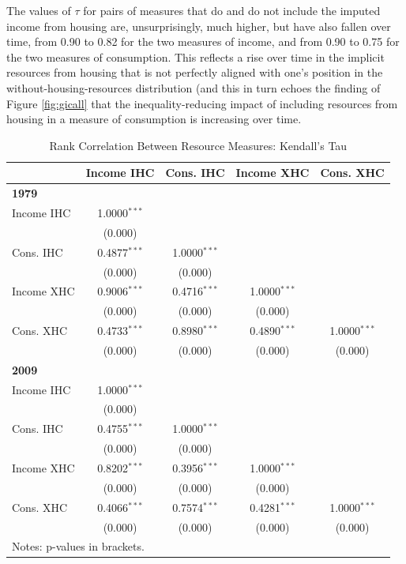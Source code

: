 The values of $\tau$ for pairs of measures that do and do not include the imputed income from housing are, unsurprisingly, much higher, but have also fallen over time, from 0.90 to 0.82 for the two measures of income, and from 0.90 to 0.75 for the two measures of consumption. This reflects a rise over time in the implicit resources from housing that is not perfectly aligned with one's position in the without-housing-resources distribution (and this in turn echoes the finding of Figure \ref{fig:gicall} that the inequality-reducing impact of including resources from housing in a measure of consumption is increasing over time.

\begin{table}[tp!]
\caption{Rank Correlation Between Resource Measures: Kendall's Tau}
\centering
\begin{tabular}{lcccc}
\hline\hline 	
 &  Income IHC & Cons. IHC & Income XHC & Cons. XHC \\
\hline
\multicolumn{5}{l}{\textbf{1979}}  \\
Income IHC &1.0000$^{***}$ & & & \\
 & (0.000)  & & & \\
Cons. IHC & 0.4877$^{***}$&1.0000$^{***}$ & & \\
 & (0.000) &(0.000) & & \\
Income XHC & 0.9006$^{***}$&0.4716$^{***}$ &1.0000$^{***}$ & \\
  & (0.000) &(0.000) & (0.000) & \\
Cons. XHC &0.4733$^{***}$ &0.8980$^{***}$ &0.4890$^{***}$ &1.0000$^{***}$ \\
 & (0.000) &(0.000) & (0.000) & (0.000) \\
\hline
\multicolumn{5}{l}{\textbf{2009}}  \\
Income IHC &1.0000$^{***}$ & & & \\
 & (0.000)  & & & \\
Cons. IHC & 0.4755$^{***}$&1.0000$^{***}$ & & \\
 & (0.000) &(0.000) & & \\
Income XHC & 0.8202$^{***}$&0.3956$^{***}$ &1.0000$^{***}$ & \\
  & (0.000) &(0.000) & (0.000) & \\
Cons. XHC &0.4066$^{***}$ &0.7574$^{***}$ &0.4281$^{***}$ &1.0000$^{***}$ \\
 & (0.000) &(0.000) & (0.000) & (0.000) \\
\hline\hline
\multicolumn{5}{l}{Notes: p-values in brackets. }
\end{tabular}
\label{table:kendall}
\end{table}

